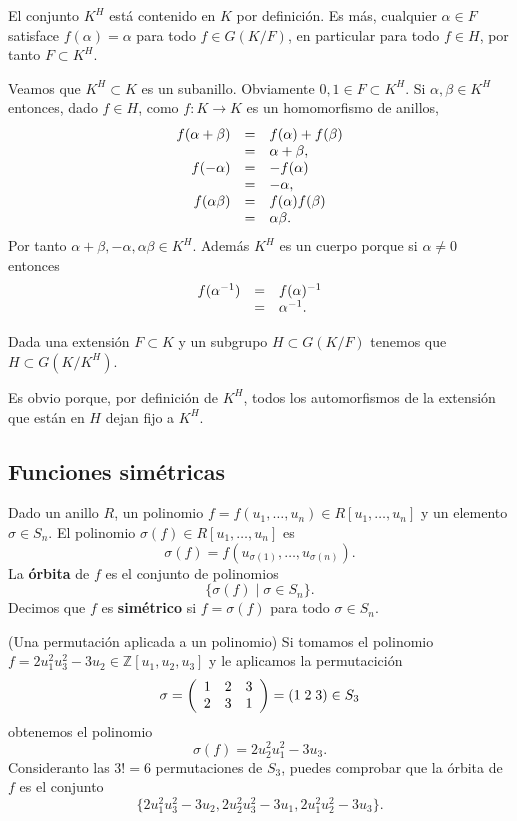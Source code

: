 
El conjunto \(K^H\) está contenido en \(K\) por definición. Es más,
cualquier \(\alpha\in F\) satisface \(f(\alpha)=\alpha\) para todo
\(f\in G(K/F)\), en particular para todo \(f\in H\), por tanto
\(F\subset K^H\).

Veamos que \(K^H\subset K\) es un subanillo. Obviamente
\(0,1\in F\subset K^H\). Si \(\alpha,\beta\in K^H\) entonces, dado
\(f\in H\), como \(f\colon K\rightarrow K\) es un homomorfismo de
anillos, \[\begin{array}{rcl}
f(\alpha+\beta)&=&f(\alpha)+f(\beta)\cr
&=&\alpha+\beta,\cr
f(-\alpha)&=&-f(\alpha)\cr
&=&-\alpha,\cr
f(\alpha\beta)&=&f(\alpha)f(\beta)\cr
&=&\alpha\beta.
\end{array}\] Por tanto \(\alpha+\beta,-\alpha,\alpha\beta\in K^H\).
Además \(K^H\) es un cuerpo porque si \(\alpha\neq 0\) entonces
\[\begin{array}{rcl}
f(\alpha^{-1})&=&f(\alpha)^{-1}\cr
&=&\alpha^{-1}.
\end{array}\] 


Dada una extensión \(F\subset K\) y un subgrupo \(H\subset G(K/F)\)
tenemos que \(H\subset G(K/K^H)\). 


Es obvio porque, por definición de \(K^H\), todos los automorfismos de
la extensión que están en \(H\) dejan fijo a \(K^H\). 

\hypertarget{funciones-simuxe9tricas}{%
\subsection{Funciones simétricas}\label{funciones-simuxe9tricas}}


Dado un anillo \(R\), un polinomio
\(f=f(u_1,\dots,u_n)\in R[u_1,\dots,u_n]\) y un elemento
\(\sigma\in S_n\). El polinomio \(\sigma(f)\in R[u_1,\dots,u_n]\) es
\[
\sigma(f)=f(u_{\sigma(1)},\dots, u_{\sigma(n)}).
\] La \textbf{órbita} de \(f\) es el conjunto de polinomios
\[\{\sigma(f)\mid \sigma\in S_n\}.\] Decimos que \(f\) es
\textbf{simétrico} si \(f=\sigma(f)\) para todo \(\sigma\in S_n\).

\textrm{\normalfont (Una permutación aplicada a un polinomio)}
Si tomamos el polinomio
\(f=2u_1^2u_3^2-3u_2\in\mathbb{Z}[u_1,u_2,u_3]\) y le aplicamos la
permutacición \[\sigma=\left(
\begin{array}{ccc}
1&2&3\cr
2&3&1
\end{array}
\right)=(1\;2\;3)\in S_3\] obtenemos el polinomio
\[\sigma(f)=2u_2^2u_1^2-3u_3.\] Consideranto las \(3!=6\)
permutaciones de \(S_3\), puedes comprobar que la órbita de \(f\) es el
conjunto \[
\{2u_1^2u_3^2-3u_2, 2u_2^2u_3^2-3u_1, 2u_1^2u_2^2-3u_3\}.
\] 

